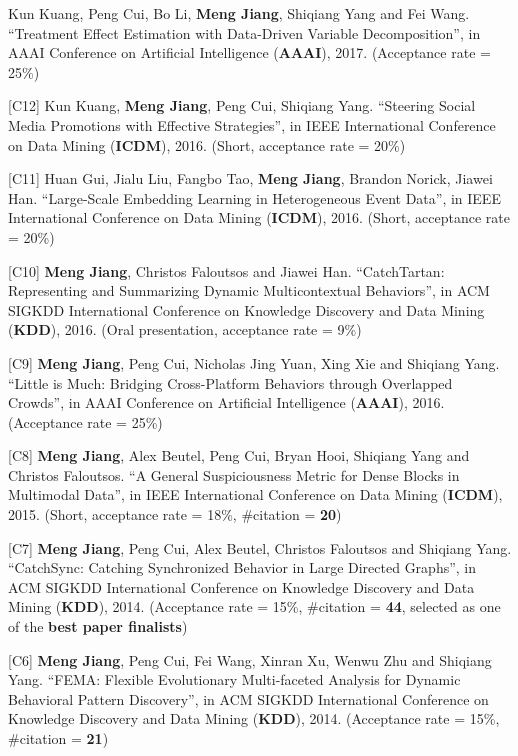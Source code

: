 \documentclass[margin, 10pt]{res}
\begin{document}
\begin{resume}
[C13] Kun Kuang, Peng Cui, Bo Li, \textbf{Meng Jiang}, Shiqiang Yang and Fei Wang. ``Treatment Effect Estimation with Data-Driven Variable Decomposition'', in AAAI Conference on Artificial Intelligence (\textbf{AAAI}), 2017. (Acceptance rate = 25\%)

[C12] Kun Kuang, \textbf{Meng Jiang}, Peng Cui, Shiqiang Yang. ``Steering Social Media Promotions with Effective Strategies'', in IEEE International Conference on Data Mining (\textbf{ICDM}), 2016. (Short, acceptance rate = 20\%)

[C11] Huan Gui, Jialu Liu, Fangbo Tao, \textbf{Meng Jiang}, Brandon Norick, Jiawei Han. ``Large-Scale Embedding Learning in Heterogeneous Event Data'', in IEEE International Conference on Data Mining (\textbf{ICDM}), 2016. (Short, acceptance rate = 20\%)

[C10] \textbf{Meng Jiang}, Christos Faloutsos and Jiawei Han. ``CatchTartan: Representing and Summarizing Dynamic Multicontextual Behaviors'', in ACM SIGKDD International Conference on Knowledge Discovery and Data Mining (\textbf{KDD}), 2016. (Oral presentation, acceptance rate = 9\%)

[C9] \textbf{Meng Jiang}, Peng Cui, Nicholas Jing Yuan, Xing Xie and Shiqiang Yang. ``Little is Much: Bridging Cross-Platform Behaviors through Overlapped Crowds'', in AAAI Conference on Artificial Intelligence (\textbf{AAAI}), 2016. (Acceptance rate = 25\%)

[C8] \textbf{Meng Jiang}, Alex Beutel, Peng Cui, Bryan Hooi, Shiqiang Yang and Christos Faloutsos. ``A General Suspiciousness Metric for Dense Blocks in Multimodal Data'', in IEEE International Conference on Data Mining (\textbf{ICDM}), 2015. (Short, acceptance rate = 18\%, \#citation = \textbf{20})

[C7] \textbf{Meng Jiang}, Peng Cui, Alex Beutel, Christos Faloutsos and Shiqiang Yang. ``CatchSync: Catching Synchronized Behavior in Large Directed Graphs'', in ACM SIGKDD International Conference on Knowledge Discovery and Data Mining (\textbf{KDD}), 2014. (Acceptance rate = 15\%, \#citation = \textbf{44}, selected as one of the \textbf{best paper finalists})

[C6] \textbf{Meng Jiang}, Peng Cui, Fei Wang, Xinran Xu, Wenwu Zhu and Shiqiang Yang. ``FEMA: Flexible Evolutionary Multi-faceted Analysis for Dynamic Behavioral Pattern Discovery'', in ACM SIGKDD International Conference on Knowledge Discovery and Data Mining (\textbf{KDD}), 2014. (Acceptance rate = 15\%, \#citation = \textbf{21})


\end{resume}
\end{document}
